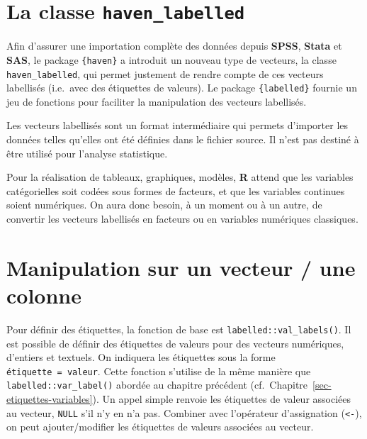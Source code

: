 \documentclass[
  letterpaper,
  DIV=11,
  numbers=noendperiod,
  oneside]{scrreprt}
\begin{document}
\hypertarget{la-classe-haven_labelled}{%
\section{\texorpdfstring{La classe
\texttt{haven\_labelled}}{La classe haven\_labelled}}\label{la-classe-haven_labelled}}

Afin d'assurer une importation complète des données depuis
\textbf{SPSS}, \textbf{Stata} et \textbf{SAS}, le package
\texttt{\{haven\}} a introduit un nouveau type de vecteurs, la classe
\texttt{haven\_labelled}, qui permet justement de rendre compte de ces
vecteurs labellisés (i.e.~avec des étiquettes de valeurs). Le package
\texttt{\{labelled\}} fournie un jeu de fonctions pour faciliter la
manipulation des vecteurs labellisés.

\begin{tcolorbox}[enhanced jigsaw, colbacktitle=quarto-callout-important-color!10!white, opacityback=0, toprule=.15mm, colback=white, coltitle=black, bottomtitle=1mm, toptitle=1mm, titlerule=0mm, rightrule=.15mm, title=\textcolor{quarto-callout-important-color}{\faExclamation}\hspace{0.5em}{Important}, breakable, bottomrule=.15mm, opacitybacktitle=0.6, arc=.35mm, left=2mm, leftrule=.75mm, colframe=quarto-callout-important-color-frame]

Les vecteurs labellisés sont un format intermédiaire qui permets
d'importer les données telles qu'elles ont été définies dans le fichier
source. Il n'est pas destiné à être utilisé pour l'analyse statistique.

Pour la réalisation de tableaux, graphiques, modèles, \textbf{R} attend
que les variables catégorielles soit codées sous formes de facteurs, et
que les variables continues soient numériques. On aura donc besoin, à un
moment ou à un autre, de convertir les vecteurs labellisés en facteurs
ou en variables numériques classiques.

\end{tcolorbox}

\hypertarget{manipulation-sur-un-vecteur-une-colonne-1}{%
\section{Manipulation sur un vecteur / une
colonne}\label{manipulation-sur-un-vecteur-une-colonne-1}}

Pour définir des étiquettes, la fonction de base est
\texttt{labelled::val\_labels()}. Il est possible de définir des
étiquettes de valeurs pour des vecteurs numériques, d'entiers et
textuels. On indiquera les étiquettes sous la forme
\texttt{étiquette\ =\ valeur}. Cette fonction s'utilise de la même
manière que \texttt{labelled::var\_label()} abordée au chapitre
précédent (cf.~Chapitre~\ref{sec-etiquettes-variables}). Un appel simple
renvoie les étiquettes de valeur associées au vecteur, \texttt{NULL}
s'il n'y en n'a pas. Combiner avec l'opérateur d'assignation
(\texttt{\textless{}-}), on peut ajouter/modifier les étiquettes de
valeurs associées au vecteur.
\end{document}
